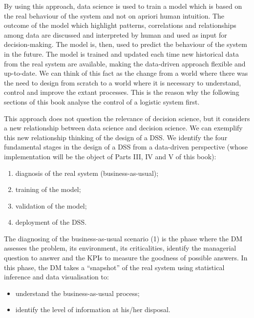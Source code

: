 By using this approach, data science is used to train a model which is based on the real behaviour of the system and not on apriori human intuition. The outcome of the model which highlight patterns, correlations and relationships among data are discussed and interpreted by human and used as input for decision-making. The model is, then, used to predict the behaviour of the system in the future. The model is trained and updated each time new historical data from the real system are available, making the data-driven approach flexible and up-to-date. We can think of this fact as the change from a world where there was the need to design from scratch to a world where it is necessary to understand, control and improve the extant processes. This is the reason why the following sections of this book analyse the control of a logistic system first.\par

This approach does not question the relevance of decision science, but it considers a new relationship between data science and decision science. We can exemplify this new relationship thinking of the design of a DSS. We identify the four fundamental stages in the design of a DSS from a data-driven perspective (whose implementation will be the object of Parts III, IV and V of this book):

\begin{enumerate}
    \item diagnosis of the real system (business-as-usual);
    \item training of the model;
    \item validation of the model;
    \item deployment of the DSS.

\end{enumerate}

The diagnosing of the business-as-usual scenario (1) is the phase where the DM assesses the problem, its environment, its criticalities, identify the managerial question to answer and the KPIs to measure the goodness of possible answers. In this phase, the DM takes a “snapshot” of the real system using statistical inference and data visualisation to:

\begin{itemize}
    \item understand the business-as-usual process;
    \item identify the level of information at his/her disposal.

\end{itemize}

